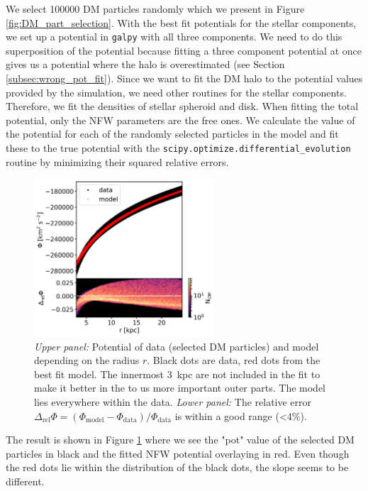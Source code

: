 We select 100000 \ac{DM} particles randomly which we present in Figure \ref{fig:DM_part_selection}. With the best fit potentials for the stellar components, we set up a potential in \texttt{galpy} with all three components. We need to do this superposition of the potential because fitting a three component potential at once gives us a potential where the halo is overestimated (see Section \ref{subsec:wrong_pot_fit}). Since we want to fit the \ac{DM} halo to the potential values provided by the simulation, we need other routines for the stellar components. Therefore, we fit the densities of stellar spheroid and disk. When fitting the total potential, only the \ac{NFW} parameters are the free ones. We calculate the value of the potential for each of the randomly selected particles in the model and fit these to the true potential with the \texttt{scipy.optimize.differential\_evolution} routine by minimizing their squared relative errors.
\begin{figure}
\captionsetup{format=plain}
    \centering
    \includegraphics[width=0.6\textwidth]{plots/Auriga/phi_model_and_data_snap_with_rel_error_127.png}
    \caption{\textit{Upper panel:} Potential of data (selected \ac{DM} particles) and model depending on the radius $r$. Black dots are data, red dots from the best fit model. The innermost \SI{3}{kpc} are not included in the fit to make it better in the to us more important outer parts. The model lies everywhere within the data. \textit{Lower panel:} The relative error $\Delta_\mathrm{rel}\Phi = (\Phi_\mathrm{model} - \Phi_\mathrm{data})/\Phi_\mathrm{data}$ is within a good range (<4\%).}
    \label{fig:potential_best_fit}
\end{figure}
The result is shown in Figure \ref{fig:potential_best_fit} where we see the "pot" value of the selected \ac{DM} particles in black and the fitted \ac{NFW} potential overlaying in red. Even though the red dots lie within the distribution of the black dots, the slope seems to be different. 
